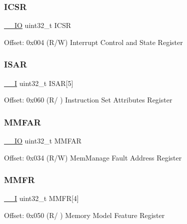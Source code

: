 \subsubsection{\texorpdfstring{I\+C\+SR}{ICSR}}
{\footnotesize\ttfamily \mbox{\hyperlink{core__cm3_8h_aec43007d9998a0a0e01faede4133d6be}{\+\_\+\+\_\+\+IO}} uint32\+\_\+t I\+C\+SR}

Offset\+: 0x004 (R/W) Interrupt Control and State Register \mbox{\label{struct_s_c_b___type_a130a0c6b3da7f29507a1888afbdce7ee}} 
\subsubsection{\texorpdfstring{I\+S\+AR}{ISAR}}
{\footnotesize\ttfamily \mbox{\hyperlink{core__cm3_8h_af63697ed9952cc71e1225efe205f6cd3}{\+\_\+\+\_\+I}} uint32\+\_\+t I\+S\+AR\mbox{[}5\mbox{]}}

Offset\+: 0x060 (R/ ) Instruction Set Attributes Register \mbox{\label{struct_s_c_b___type_a88820a178974aa7b7927155cee5c47ed}} 
\subsubsection{\texorpdfstring{M\+M\+F\+AR}{MMFAR}}
{\footnotesize\ttfamily \mbox{\hyperlink{core__cm3_8h_aec43007d9998a0a0e01faede4133d6be}{\+\_\+\+\_\+\+IO}} uint32\+\_\+t M\+M\+F\+AR}

Offset\+: 0x034 (R/W) Mem\+Manage Fault Address Register \mbox{\label{struct_s_c_b___type_ab0dc71239f7d5ffe2e78e683b9530064}} 
\subsubsection{\texorpdfstring{M\+M\+FR}{MMFR}}
{\footnotesize\ttfamily \mbox{\hyperlink{core__cm3_8h_af63697ed9952cc71e1225efe205f6cd3}{\+\_\+\+\_\+I}} uint32\+\_\+t M\+M\+FR\mbox{[}4\mbox{]}}

Offset\+: 0x050 (R/ ) Memory Model Feature Register \mbox{\label{struct_s_c_b___type_a00a6649cfac6bbadee51d6ba4c73001d}} 

